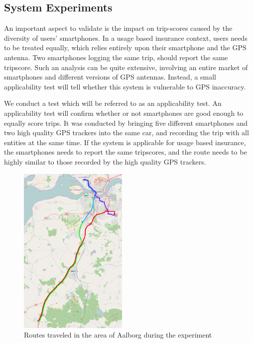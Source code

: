 \subsection{System Experiments}\label{subsec:expsystem}
An important aspect to validate is the impact on trip-scores caused by the diversity of users' smartphones. In a usage based insurance context, users needs to be treated equally, which relies entirely upon their smartphone and the GPS antenna. Two smartphones logging the same trip, should report the same tripscore. Such an analysis can be quite extensive, involving an entire market of smartphones and different versions of GPS antennas. Instead, a small applicability test will tell whether this system is vulnerable to GPS inaccuracy. 

We conduct a test which will be referred to as an applicability test. An applicability test will confirm whether or not smartphones are good enough to equally score trips. It was conducted by bringing five different smartphones and two high quality GPS trackers\citep{quality_gps_device} into the same car, and recording the trip with all entities at the same time. If the system is applicable for usage based insurance, the smartphones needs to report the same tripscores, and the route needs to be highly similar to those recorded by the high quality GPS trackers.
 
\begin{figure}[tb]
\centering
\includegraphics[width=0.465\textwidth]{Pictures/experiment_routes}
\caption{Routes traveled in the area of Aalborg during the experiment}
\label{fig:experiment_routes}
\end{figure}

